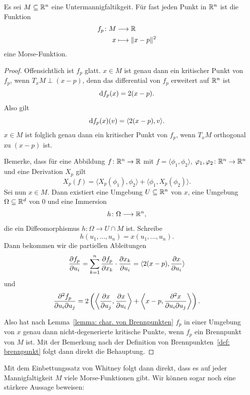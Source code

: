 \begin{prop}
    \label{prop: existenz morse-funktionen}
    Es sei $M \subseteq { \mathbb R }^n$ eine Untermannigfaltikgeit. Für fast jeden Punkt in ${ \mathbb R }^n$ ist
    die Funktion
    \begin{align*}
        f_p \colon M & \longrightarrow { \mathbb R } \\
        x & \longmapsto \| x - p \|^2
    \end{align*}
    eine Morse-Funktion.
\end{prop}

\begin{proof}
    Offensichtlich ist $f_p$ glatt. $x \in M$ ist genau dann ein kritischer Punkt von $f_p$, wenn
    $T_xM \perp (x - p)$, denn das differential von $f_p$ erweitert auf ${ \mathbb R }^n$ ist
    \[ { \operatorname{d} } f_p (x) = 2 (x - p). \]
    Also gilt
    \[ { \operatorname{d} } f_p (x) (v) = \langle 2 (x - p), v \rangle . \]
    $x \in M$ ist folglich genau dann ein kritischer Punkt von $f_p$, wenn $T_xM$ orthogonal 
    zu $(x - p)$ ist.

    Bemerke, dass für eine Abbildung $f \colon { \mathbb R }^n \to { \mathbb R }$ mit $f = \langle \phi_1, \phi_2 \rangle$,
    $\varphi_1, \varphi_2 \colon { \mathbb R }^n \to { \mathbb R }^n$ und eine Derivation $X_p$ gilt 
    \[ X_p (f) = \langle X_p(\phi_1), \phi_2 \rangle + \langle \phi_1, X_p(\phi_2) \rangle.  \]
    Sei nun $x \in M$. Dann existiert eine Umgebung $U \subseteq { \mathbb R }^n$ von $x$, eine Umgebung 
    $\Omega \subseteq { \mathbb R }^d$ von $0$ und eine Immersion 
    \[ h \colon \Omega \longrightarrow { \mathbb R }^n , \]
    die ein Diffeomorphismus $h \colon \Omega \to U \cap M$ ist.
    Schreibe
    \[ h(u_1, ..., u_n) = x(u_1, ..., u_n). \]
    Dann bekommen wir die partiellen Ableitungen
    \[ 
        \pderive[f_p]{u_i} = \sum_{k = 1}^n \pderive[f_p]{x_k} \cdot \pderive[x_k]{u_i} 
        = \langle 2(x - p), \pderive[x]{u_i} \rangle 
    \]
    und 
    \[ 
        \pdderive[f_p]{u_i}{u_j} = 
            2 \left( \left\langle \pderive[x]{u_j}, \pderive[x]{u_i} \right\rangle + 
            \left\langle x - p , \pdderive[x]{u_i}{u_j} \right\rangle \right) 
    . \]
    
    Also hat nach Lemma~\ref{lemma: char. von Brennpunkten} $f_p$ in einer Umgebung von $x$ genau 
    dann nicht-degenerierte kritische Punkte, wenn $f_p$ ein Brennpunkt von $M$ ist. Mit der 
    Bemerkung nach der Definition von Brennpunkten~\ref{def: brennpunkt} folgt dann direkt die 
    Behauptung.
\end{proof}

\begin{remark}
    Mit dem Einbettungssatz von Whitney folgt dann direkt, dass es auf jeder Mannigfaltigkeit 
    $M$ viele Morse-Funktionen gibt. Wir können sogar noch eine stärkere Aussage beweisen:
\end{remark}

